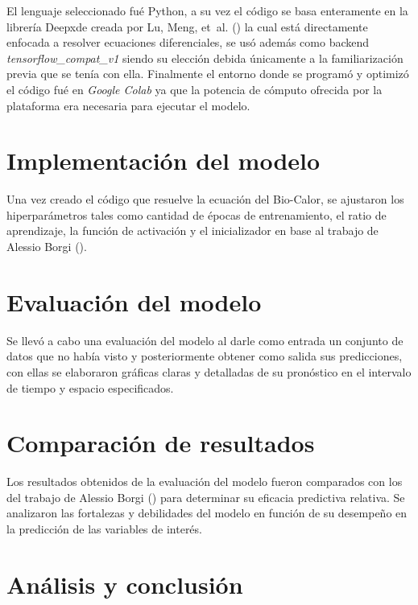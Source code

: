 \documentclass[
  spanish,
  us-letterpaper,
  DIV=11,
  numbers=noendperiod]{scrreprt}
\theoremstyle{definition}
\theoremstyle{plain}
\theoremstyle{remark}
\begin{document}
El lenguaje seleccionado fué Python, a su vez el código se basa
enteramente en la librería Deepxde creada por Lu, Meng, et~al.
() la cual está directamente enfocada a
resolver ecuaciones diferenciales, se usó además como backend
\emph{tensorflow\_compat\_v1} siendo su elección debida únicamente a la
familiarización previa que se tenía con ella. Finalmente el entorno
donde se programó y optimizó el código fué en \emph{Google Colab} ya que
la potencia de cómputo ofrecida por la plataforma era necesaria para
ejecutar el modelo.

\section{Implementación del modelo}\label{implementaciuxf3n-del-modelo}

Una vez creado el código que resuelve la ecuación del Bio-Calor, se
ajustaron los hiperparámetros tales como cantidad de épocas de
entrenamiento, el ratio de aprendizaje, la función de activación y el
inicializador en base al trabajo de Alessio Borgi
().

\section{Evaluación del modelo}\label{evaluaciuxf3n-del-modelo}

Se llevó a cabo una evaluación del modelo al darle como entrada un
conjunto de datos que no había visto y posteriormente obtener como
salida sus predicciones, con ellas se elaboraron gráficas claras y
detalladas de su pronóstico en el intervalo de tiempo y espacio
especificados.

\section{Comparación de resultados}\label{comparaciuxf3n-de-resultados}

Los resultados obtenidos de la evaluación del modelo fueron comparados
con los del trabajo de Alessio Borgi ()
para determinar su eficacia predictiva relativa. Se analizaron las
fortalezas y debilidades del modelo en función de su desempeño en la
predicción de las variables de interés.

\section{Análisis y conclusión}\label{anuxe1lisis-y-conclusiuxf3n}
\end{document}

